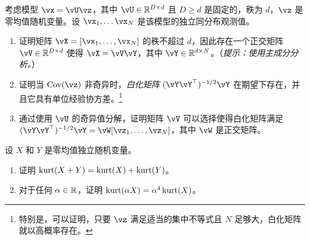 \documentclass[../../book-main_zh.tex]{subfiles}
\begin{document}
\begin{exercise}\label{exercise:whitening}
    考虑模型 $\vx = \vU \vz$，其中 $\vU \in \R^{D \times d}$ 且 $D \geq d$ 是固定的，秩为 $d$，$\vz$ 是零均值随机变量。设 $\vx_1, \dots \vx_N$ 是该模型的独立同分布观测值。
    \begin{enumerate}
        \item 证明矩阵 $\vX = [\vx_1, \dots, \vx_N]$ 的秩不超过 $d$，因此存在一个正交矩阵 $\vV \in \R^{D \times d}$ 使得 $\vX = \vV \vY$，其中 $\vY \in \R^{d \times N}$。（\textit{提示：使用主成分分析。}）
        \item 证明当 $\Cov(\vz)$ 非奇异时，\textit{白化矩阵} $(\vY \vY^\top)^{-1/2}\vY$ 在期望下存在，并且它具有单位经验协方差。\footnote{特别是，可以证明，只要 $\vz$ 满足适当的集中不等式且 $N$ 足够大，白化矩阵就以高概率存在。}
        \item 通过使用 $\vU$ 的奇异值分解，证明矩阵 $\vV$ 可以选择使得白化矩阵满足 $(\vY \vY^\top)^{-1/2} \vY = \vW [\vz_1, \dots, \vz_N]$，其中 $\vW$ 是正交矩阵。
    \end{enumerate}
\end{exercise}

\begin{exercise}\label{exercise:kurtosis-linearity-properties}
    设 $X$ 和 $Y$ 是零均值独立随机变量。
    \begin{enumerate}
        \item 证明 $\mathop{\mathrm{kurt}}(X + Y) = \mathop{\mathrm{kurt}}(X) + \mathop{\mathrm{kurt}}(Y)$。
        \item 对于任何 $\alpha \in \mathbb{R}$，证明 $\mathop{\mathrm{kurt}}(\alpha X) = \alpha^4 \mathop{\mathrm{kurt}}(X)$。
    \end{enumerate}
\end{exercise}
\end{document}
